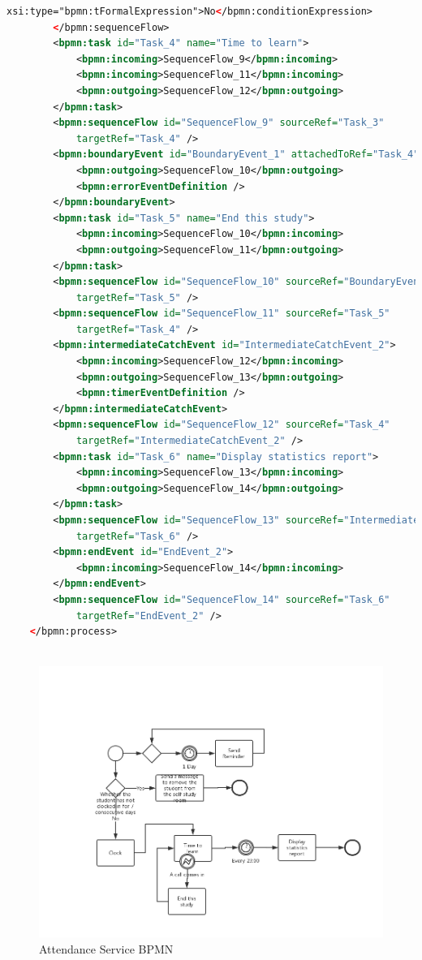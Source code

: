 \documentclass[runningheads]{llncs}
\begin{document}
\begin{lstlisting}[language={XML}]
				xsi:type="bpmn:tFormalExpression">No</bpmn:conditionExpression>
		</bpmn:sequenceFlow>
		<bpmn:task id="Task_4" name="Time to learn">
	        <bpmn:incoming>SequenceFlow_9</bpmn:incoming>
			<bpmn:incoming>SequenceFlow_11</bpmn:incoming>
	        <bpmn:outgoing>SequenceFlow_12</bpmn:outgoing>
	    </bpmn:task>
		<bpmn:sequenceFlow id="SequenceFlow_9" sourceRef="Task_3"
	        targetRef="Task_4" />
		<bpmn:boundaryEvent id="BoundaryEvent_1" attachedToRef="Task_4">
			<bpmn:outgoing>SequenceFlow_10</bpmn:outgoing>
			<bpmn:errorEventDefinition />
		</bpmn:boundaryEvent>
		<bpmn:task id="Task_5" name="End this study">
	        <bpmn:incoming>SequenceFlow_10</bpmn:incoming>
	        <bpmn:outgoing>SequenceFlow_11</bpmn:outgoing>
	    </bpmn:task>
		<bpmn:sequenceFlow id="SequenceFlow_10" sourceRef="BoundaryEvent_1"
	        targetRef="Task_5" />
		<bpmn:sequenceFlow id="SequenceFlow_11" sourceRef="Task_5"
	        targetRef="Task_4" />
		<bpmn:intermediateCatchEvent id="IntermediateCatchEvent_2">
			<bpmn:incoming>SequenceFlow_12</bpmn:incoming>
			<bpmn:outgoing>SequenceFlow_13</bpmn:outgoing>
			<bpmn:timerEventDefinition />
		</bpmn:intermediateCatchEvent>
		<bpmn:sequenceFlow id="SequenceFlow_12" sourceRef="Task_4"
	        targetRef="IntermediateCatchEvent_2" />
		<bpmn:task id="Task_6" name="Display statistics report">
	        <bpmn:incoming>SequenceFlow_13</bpmn:incoming>
	        <bpmn:outgoing>SequenceFlow_14</bpmn:outgoing>
	    </bpmn:task>
		<bpmn:sequenceFlow id="SequenceFlow_13" sourceRef="IntermediateCatchEvent_2"
	        targetRef="Task_6" />
		<bpmn:endEvent id="EndEvent_2">
			<bpmn:incoming>SequenceFlow_14</bpmn:incoming>
		</bpmn:endEvent>
		<bpmn:sequenceFlow id="SequenceFlow_14" sourceRef="Task_6"
	        targetRef="EndEvent_2" />
	</bpmn:process>
	
	\end{lstlisting}
	\clearpage
	\begin{figure}
		\centering %
		\includegraphics[width=1.0\textwidth]{figure/llt/attendanceservicebpmn} %
		\caption{Attendance Service BPMN} %
		\label{attendanceservicebpmn} %
	\end{figure}
\end{document}
